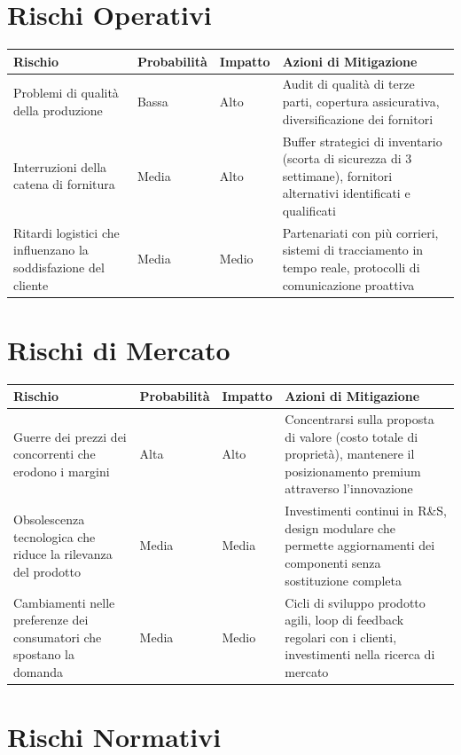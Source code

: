 \documentclass[11pt,a4paper]{report}
\begin{document}
\section{Rischi Operativi}

\begin{longtable}{|p{3.5cm}|p{2cm}|p{2cm}|p{3.5cm}|}
\hline
\textbf{Rischio} & \textbf{Probabilità} & \textbf{Impatto} & \textbf{Azioni di Mitigazione} \\ \hline
Problemi di qualità della produzione & Bassa & Alto & Audit di qualità di terze parti, copertura assicurativa, diversificazione dei fornitori \\ \hline
Interruzioni della catena di fornitura & Media & Alto & Buffer strategici di inventario (scorta di sicurezza di 3 settimane), fornitori alternativi identificati e qualificati \\ \hline
Ritardi logistici che influenzano la soddisfazione del cliente & Media & Medio & Partenariati con più corrieri, sistemi di tracciamento in tempo reale, protocolli di comunicazione proattiva \\ \hline
\end{longtable}

\section{Rischi di Mercato}

\begin{longtable}{|p{3.5cm}|p{2cm}|p{2cm}|p{3.5cm}|}
\hline
\textbf{Rischio} & \textbf{Probabilità} & \textbf{Impatto} & \textbf{Azioni di Mitigazione} \\ \hline
Guerre dei prezzi dei concorrenti che erodono i margini & Alta & Alto & Concentrarsi sulla proposta di valore (costo totale di proprietà), mantenere il posizionamento premium attraverso l'innovazione \\ \hline
Obsolescenza tecnologica che riduce la rilevanza del prodotto & Media & Media & Investimenti continui in R\&S, design modulare che permette aggiornamenti dei componenti senza sostituzione completa \\ \hline
Cambiamenti nelle preferenze dei consumatori che spostano la domanda & Media & Medio & Cicli di sviluppo prodotto agili, loop di feedback regolari con i clienti, investimenti nella ricerca di mercato \\ \hline
\end{longtable}

\section{Rischi Normativi}
\end{document}
